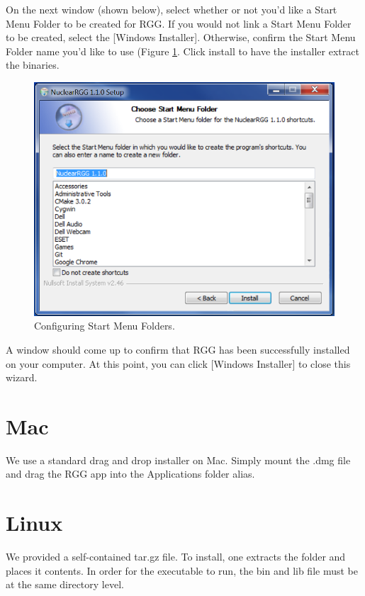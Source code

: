 On the next window (shown below), select whether or not you'd like a Start Menu Folder to be created for RGG.  If you would not link a Start Menu Folder to be created, select the [Windows Installer].  Otherwise, confirm the Start Menu Folder name you'd like to use (Figure \ref{fig:WindowsInstall3}.  Click install to have the installer extract the binaries.

\begin{figure}
	\begin{center}
		\includegraphics[width=0.9\linewidth]{Images/windows-install-3.png}
		\caption{Configuring Start Menu Folders.}
		\label{fig:WindowsInstall3}
	\end{center}
\end{figure}

A window should come up to confirm that RGG has been successfully installed on your computer.  At this point, you can click [Windows Installer] to close this wizard.

\section{Mac}
We use a standard drag and drop installer on Mac.  Simply mount the .dmg file and drag the RGG app into the Applications folder alias.

\section{Linux}
We provided a self-contained tar.gz file.  To install, one extracts the folder and places it contents.  In order for the executable to run, the bin and lib file must be at the same directory level.
